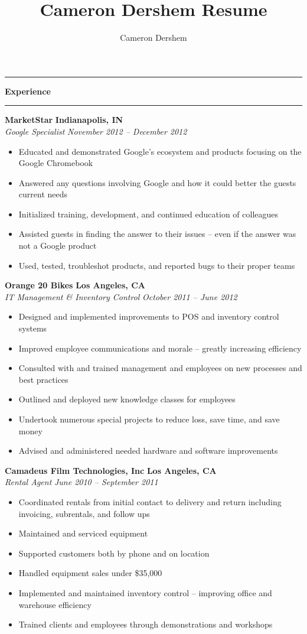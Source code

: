 \documentclass[10pt,letterpaper]{article}			%
\author{Cameron Dershem}							%
\title{Cameron Dershem Resume}						%
\newcommand{
    \JobHeader}[4]{
	\textbf{#1}
	\hfill
	\textbf{#2}
	\\
	\emph{#3}
	\hfill
	\emph{#4}
	}
\newcommand{
    \sectionHeader}[1]{
    \hrule
    \vspace{0.2em}
    {\large \textbf {#1}}
    \vspace{0.2em}
    \hrule
    \vspace{0.2em}
    }
\begin{document}


\sectionHeader{Experience}

	\JobHeader{MarketStar}{Indianapolis, IN}{Google Specialist}{November 2012 -- December 2012}
		\begin{itemize}
		    \item Educated and demonstrated Google's ecosystem and products focusing on the Google Chromebook
		    \item Answered any questions involving Google and how it could better the guests current needs
		    \item Initialized training, development, and continued education of colleagues
		    \item Assisted guests in finding the answer to their issues -- even if the answer was not a Google product
		    \item Used, tested, troubleshot products, and reported bugs to their proper teams
		\end{itemize}

	\JobHeader{Orange 20 Bikes}{Los Angeles, CA}{IT Management \& Inventory Control}{October 2011 -- June 2012}
		\begin{itemize}	
		    \item Designed and implemented improvements to POS and inventory control systems
		    \item Improved employee communications and morale -- greatly increasing efficiency
		    \item Consulted with and trained management and employees on new processes and best practices
		    \item Outlined and deployed new knowledge classes for employees 
		    \item Undertook numerous special projects to reduce loss, save time, and save money
		    \item Advised and administered needed hardware and software improvements
		\end{itemize}

	\JobHeader{Camadeus Film Technologies, Inc}{Los Angeles, CA}{Rental Agent}{June 2010 -- September 2011}
		\begin{itemize}
		    \item Coordinated rentals from initial contact to delivery and return including invoicing, subrentals, and follow ups
		    \item Maintained and serviced equipment
		    \item Supported customers both by phone and on location
		    \item Handled equipment sales under \$35,000
		    \item Implemented and maintained inventory control -- improving office and warehouse efficiency
		    \item Trained clients and employees through demonstrations and workshops
		\end{itemize}
\end{document}
